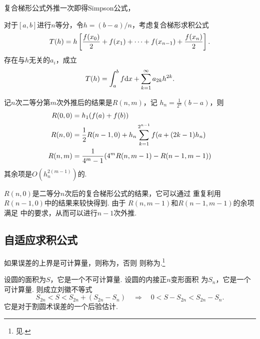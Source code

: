   \begin{pos}
    复合梯形公式外推一次即得Simpson公式，
  \end{pos}

  \begin{pos}[复合梯形公式余项]
    \label{pos: 复合梯形公式余项}
    对于$[a, b]$进行$n$等分，令$h = (b-a)/n$，考虑复合梯形求积公式
    \[
      T(h) = h\left[ \frac{\mathnormal{f}(x_0)}{2} + \mathnormal{f}(x_1)
      +\cdots + \mathnormal{f}(x_{n-1}) + \frac{\mathnormal{f}(x_n)}{2} \right].
    \]
    存在与$h$无关的$a_i$，成立
    \[
      T(h) = \int_a^b\mathnormal{f}\mathrm{d} x + \sum_{k=1}^\infty a_{2k}h^{2k}.
    \]
  \end{pos}

  \begin{alg}[Romberg算法]
    记$n$次二等分第$m$次外推后的结果是$R(n, m)$，记
    $h_n = \frac{1}{2^n}(b-a)$，则
    \[\begin{split}
      R(0, 0) &= h_1(\mathnormal{f}(a) + \mathnormal{f}(b)) \\
      R(n, 0) &= \frac{1}{2}R(n-1, 0)
      + h_n\sum_{k=1}^{2^{n-1}}\mathnormal{f}(a+(2k-1)h_n) \\
      R(n, m) &= \frac{1}{4^m-1}(
        4^mR(n,m-1) - R(n-1,m-1)
      )
    \end{split}\]
    其余项是$O(h_n^{2(m-1)})$的.
  \end{alg}
  \remark
    $R(n, 0)$是二等分$n$次后的复合梯形公式的结果，它可以通过
    重复利用$R(n-1, 0)$中的结果来较快得到. 由于
    $R(n, m-1)$和$R(n-1, m-1)$的余项满足
    中的要求，从而可以进行$n-1$次外推.

\subsection{自适应求积公式}
  \begin{defi}[后验估计]
    如果误差的上界是可计算量，则称为，否则
    则称为.\footnote{见.}
  \end{defi}

  \begin{exa}[刘徽割圆术]
    \label{exa: 刘徽割圆术}
    设圆的面积为$S$，它是一个不可计算量. 设圆的内接正$n$变形面积
    为$S_n$，它是一个可计算量. 则成立刘徽不等式
    \[
      S_{2n} < S < S_{2n} + (S_{2n} - S_n)
      \quad\Rightarrow\quad
      0 < S - S_{2n} < S_{2n} - S_n.
    \]
    它是对于割圆术误差的一个后验估计.
  \end{exa}


